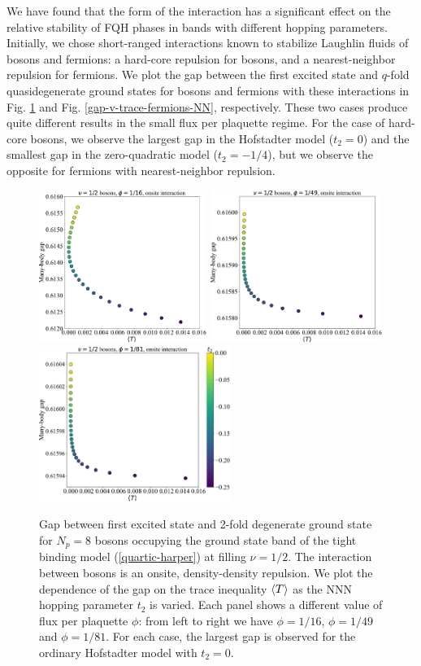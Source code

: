 \documentclass[aps,prb,twocolumn,letterpaper,twoside,nobalancelastpage,groupedaddress,amsmath,amssymb,floatfix,citeautoscript]{revtex4-1}
\begin{document}
We have found that the form of the interaction has a significant effect on the relative stability of FQH phases in bands with different hopping parameters. Initially, we chose short-ranged interactions known to stabilize Laughlin fluids of bosons and fermions: a hard-core repulsion for bosons, and a nearest-neighbor repulsion for fermions. We plot the gap between the first excited state and $q$-fold quasidegenerate ground states for bosons and fermions with these interactions in Fig. \ref{gap-v-trace-bosons} and Fig. \ref{gap-v-trace-fermions-NN}, respectively. These two cases produce quite different results in the small flux per plaquette regime. For the case of hard-core bosons, we observe the largest gap in the Hofstadter model ($t_2=0$) and the smallest gap in the zero-quadratic model ($t_2 = -1/4$), but we observe the opposite for fermions with nearest-neighbor repulsion.
\begin{figure}[t]
\includegraphics[width=2.15in]{gap-v-trace-bosons-16-onsite.pdf}
\includegraphics[width=2.2in]{gap-v-trace-bosons-49-onsite.pdf}
\includegraphics[width=2.45in]{gap-v-trace-bosons-81-onsite.pdf}
\caption{\label{gap-v-trace-bosons}Gap between first excited state and 2-fold degenerate ground state for $N_p = 8$ bosons occupying the ground state band of the tight binding model (\ref{quartic-harper}) at filling $\nu=1/2$. The interaction between bosons is an onsite, density-density repulsion. We plot the dependence of the gap on the trace inequality $\expval{T}$ as the NNN hopping parameter $t_2$ is varied. Each panel shows a different value of flux per plaquette $\phi$: from left to right we have $\phi=1/16$, $\phi=1/49$ and $\phi=1/81$. For each case, the largest gap is observed for the ordinary Hofstadter model with $t_2 = 0$.}
\end{figure}
\end{document}
